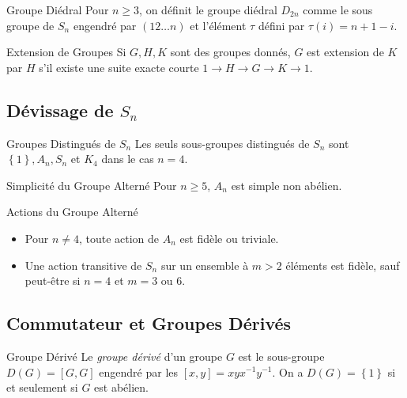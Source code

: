 \documentclass{cours}
\begin{document}
\begin{définition}{Groupe Diédral}{}
    Pour $n\geq 3$, on définit le groupe diédral $D_{2n}$ comme le sous groupe de $S_{n}$ engendré par $(1 2 \ldots n)$ et l'élément $\tau$ défini par $\tau(i) = n+1-i$.
\end{définition}

\begin{définition}{Extension de Groupes}{}
    Si $G, H, K$ sont des groupes donnés, $G$ est extension de $K$ par $H$ s'il existe une suite exacte courte $1\rightarrow H \rightarrow G \rightarrow K \rightarrow 1$.
\end{définition}


\subsection{Dévissage de $S_{n}$}

\begin{théorème}{Groupes Distingués de $S_{n}$}{}
    Les seuls sous-groupes distingués de $S_{n}$ sont $\left\{1\right\}, A_{n}, S_{n}$ et $K_4$ dans le cas $n = 4$.
\end{théorème}

\begin{théorème}{Simplicité du Groupe Alterné}{}
    Pour $n \geq 5$, $A_{n}$ est simple non abélien.
\end{théorème}

\begin{corollaire}{Actions du Groupe Alterné}{}
    \begin{itemize}
        \item Pour $n \neq 4$, toute action de $A_{n}$ est fidèle ou triviale.
        \item Une action transitive de $S_{n}$ sur un ensemble à $m > 2$ éléments est fidèle, sauf peut-être si $n=4$ et $m = 3$ ou $6$.
    \end{itemize}
\end{corollaire}

\subsection{Commutateur et Groupes Dérivés}

\begin{définition}{Groupe Dérivé}{}
    Le \emph{groupe dérivé} d'un groupe $G$ est le sous-groupe $D(G) = \left[G, G\right]$ engendré par les $\left[x, y\right] = xyx^{-1}y^{-1}$. On a $D(G) = \left\{1\right\}$ si et seulement si $G$ est abélien.
\end{définition}
\end{document}
